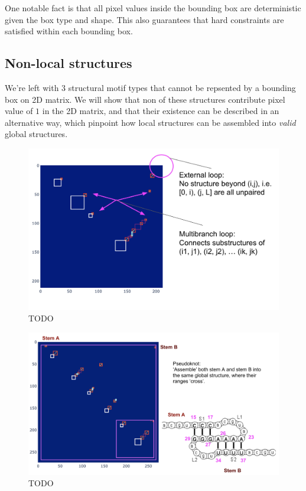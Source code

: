 \documentclass[12pt]{article}
\begin{document}
One notable fact is that all pixel values inside the bounding box are deterministic given the box type and shape.
This also guarantees that hard constraints are satisfied within each bounding box.

\subsection{Non-local structures}

We're left with $3$ structural motif types that cannot be repsented by a bounding box on 2D matrix.
We will show that non of these structures contribute pixel value of $1$ in the 2D matrix,
and that their existence can be described in an alternative way,
which pinpoint how local structures can be assembled into \textit{valid} global structures.

\begin{figure}[h]
    \centering
    \includegraphics[width=\textwidth]{plot/non_local_structures_2d_matrix.png}
    \caption{TODO}
    \label{fig:non_local_structures_2d_matrix}
    \centering
\end{figure}


\begin{figure}[h]
    \centering
    \includegraphics[width=\textwidth]{plot/non_local_structures_pseudoknot.png}
    \caption{TODO}
    \label{fig:non_local_structures_pseudoknot}
    \centering
\end{figure}
\end{document}
